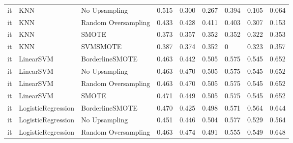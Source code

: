 \begin{tabular}{lllllllll}
      it &                          KNN &       No Upsampling & 0.515 &                     0.300 &                 0.267 &                  0.394 &                                   0.105 &     0.064 \\
      it &                          KNN & Random Oversampling & 0.433 &                     0.428 &                 0.411 &                  0.403 &                                   0.307 &     0.153 \\
      it &                          KNN &               SMOTE & 0.373 &                     0.357 &                 0.352 &                  0.352 &                                   0.322 &     0.353 \\
      it &                          KNN &            SVMSMOTE & 0.387 &                     0.374 &                 0.352 &                      0 &                                   0.323 &     0.357 \\
      it &                    LinearSVM &     BorderlineSMOTE & 0.463 &                     0.442 &                 0.505 &                  0.575 &                                   0.545 &     0.652 \\
      it &                    LinearSVM &       No Upsampling & 0.463 &                     0.470 &                 0.505 &                  0.575 &                                   0.545 &     0.652 \\
      it &                    LinearSVM & Random Oversampling & 0.463 &                     0.470 &                 0.505 &                  0.575 &                                   0.545 &     0.652 \\
      it &                    LinearSVM &               SMOTE & 0.471 &                     0.449 &                 0.505 &                  0.575 &                                   0.545 &     0.652 \\
      it &           LogisticRegression &     BorderlineSMOTE & 0.470 &                     0.425 &                 0.498 &                  0.571 &                                   0.564 &     0.644 \\
      it &           LogisticRegression &       No Upsampling & 0.451 &                     0.446 &                 0.504 &                  0.577 &                                   0.529 &     0.564 \\
      it &           LogisticRegression & Random Oversampling & 0.463 &                     0.474 &                 0.491 &                  0.555 &                                   0.549 &     0.648 \\

\end{tabular}
